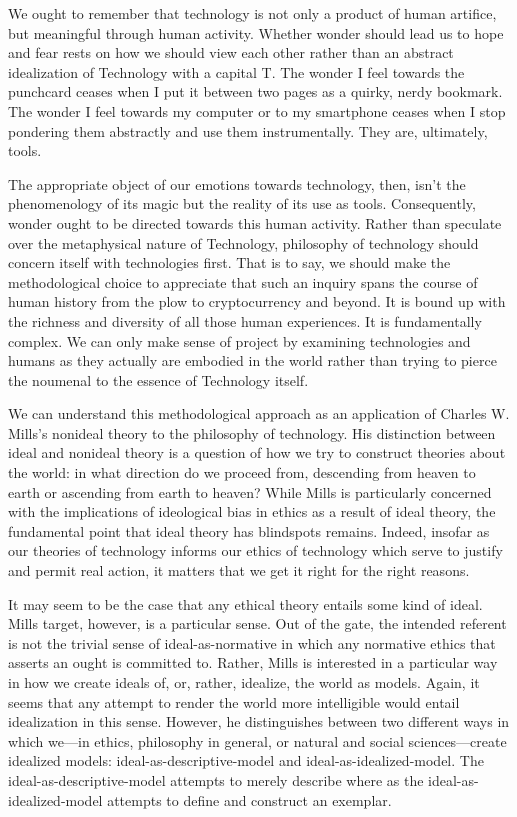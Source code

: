 \documentclass[12pt, letterpaper]{article}
\begin{document}
We ought to remember that technology is not only a product of human artifice,
but meaningful through human activity.
Whether wonder should lead us to hope and fear rests on how we should view each
other rather than an abstract idealization of Technology with a capital T.
The wonder I feel towards the punchcard ceases when I put it between two pages
as a quirky, nerdy bookmark.
The wonder I feel towards my computer or to my smartphone ceases when I stop
pondering them abstractly and use them instrumentally.
They are, ultimately, tools.

The appropriate object of our emotions towards technology, then, isn't the
phenomenology of its magic but the reality of its use as tools.
Consequently, wonder ought to be directed towards this human activity.
Rather than speculate over the metaphysical nature of Technology, philosophy of
technology should concern itself with technologies first.
That is to say, we should make the methodological choice to appreciate that such
an inquiry spans the course of human history from the plow to cryptocurrency and
beyond.
It is bound up with the richness and diversity of all those human experiences.
It is fundamentally complex.
We can only make sense of project by examining technologies and humans as they
actually are embodied in the world rather than trying to pierce the noumenal to
the essence of Technology itself.

We can understand this methodological approach as an application of Charles W.
Mills's nonideal theory to the philosophy of technology.
His distinction between ideal and nonideal theory is a question of how we try to
construct theories about the world: in what direction do we proceed from,
descending from heaven to earth or ascending from earth to heaven?
While Mills is particularly concerned with the implications of ideological bias
in ethics as a result of ideal theory, the fundamental point that ideal theory
has blindspots remains.
Indeed, insofar as our theories of technology informs our ethics of technology
which serve to justify and permit real action, it matters that we get it right
for the right reasons.

It may seem to be the case that any ethical theory entails some kind of ideal.
Mills target, however, is a particular sense.
Out of the gate, the intended referent is not the trivial sense of
ideal-as-normative in which any normative ethics that asserts an ought is
committed to.
Rather, Mills is interested in a particular way in how we create ideals of, or,
rather, idealize, the world as models.
Again, it seems that any attempt to render the world more intelligible would
entail idealization in this sense.
However, he distinguishes between two different ways in which we---in ethics,
philosophy in general, or natural and social sciences---create idealized models:
ideal-as-descriptive-model and ideal-as-idealized-model.
The ideal-as-descriptive-model attempts to merely describe where as the
ideal-as-idealized-model attempts to define and construct an exemplar.
\end{document}
